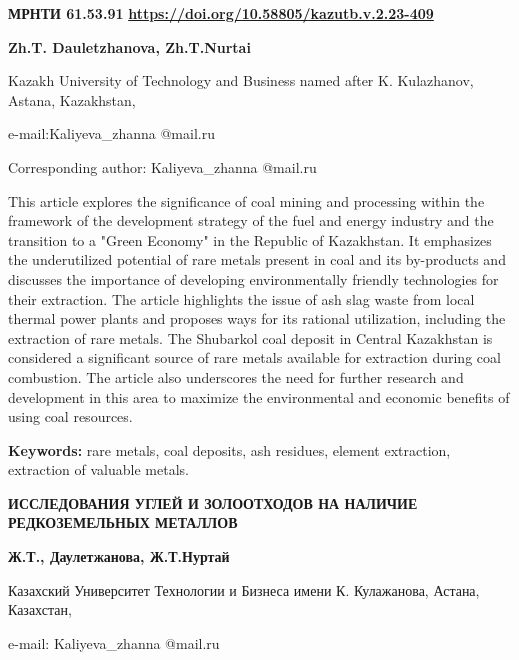 \newpage
{}
{\bfseries МРНТИ 61.53.91}
\hfill {\bfseries \href{https://doi.org/10.58805/kazutb.v.2.23-409}{https://doi.org/10.58805/kazutb.v.2.23-409}}


\begin{center}
{\bfseries Zh.T. Dauletzhanova\envelope, Zh.T.Nurtai}

Kazakh University of Technology and Business named after K. Kulazhanov,
Astana, Kazakhstan,

e-mail:Kaliyeva\_zhanna @mail.ru

\envelope Corresponding author: Kaliyeva\_zhanna @mail.ru
\end{center}

This article explores the significance of coal mining and processing
within the framework of the development strategy of the fuel and energy
industry and the transition to a "Green Economy" in the Republic of
Kazakhstan. It emphasizes the underutilized potential of rare metals
present in coal and its by-products and discusses the importance of
developing environmentally friendly technologies for their extraction.
The article highlights the issue of ash slag waste from local thermal
power plants and proposes ways for its rational utilization, including
the extraction of rare metals. The Shubarkol coal deposit in Central
Kazakhstan is considered a significant source of rare metals available
for extraction during coal combustion. The article also underscores the
need for further research and development in this area to maximize the
environmental and economic benefits of using coal resources.

{\bfseries Keywords:} rare metals, coal deposits, ash residues, element
extraction, extraction of valuable metals.

\begin{center}
{\large\bfseries ИССЛЕДОВАНИЯ УГЛЕЙ И ЗОЛООТХОДОВ НА НАЛИЧИЕ РЕДКОЗЕМЕЛЬНЫХ МЕТАЛЛОВ}

{\bfseries Ж.Т., Даулетжанова\envelope, Ж.Т.Нуртай}

Казахский Университет Технологии и Бизнеса имени К. Кулажанова, Астана,
Казахстан,

e-mail: Kaliyeva\_zhanna @mail.ru
\end{center}


